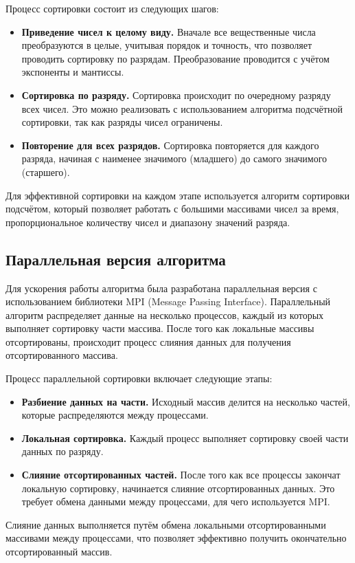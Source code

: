 \documentclass[12pt]{article}
\begin{document}
Процесс сортировки состоит из следующих шагов: \begin{itemize} \item \textbf{Приведение чисел к целому виду.} Вначале все вещественные числа преобразуются в целые, учитывая порядок и точность, что позволяет проводить сортировку по разрядам. Преобразование проводится с учётом экспоненты и мантиссы. \item \textbf{Сортировка по разряду.} Сортировка происходит по очередному разряду всех чисел. Это можно реализовать с использованием алгоритма подсчётной сортировки, так как разряды чисел ограничены. \item \textbf{Повторение для всех разрядов.} Сортировка повторяется для каждого разряда, начиная с наименее значимого (младшего) до самого значимого (старшего). \end{itemize}

Для эффективной сортировки на каждом этапе используется алгоритм сортировки подсчётом, который позволяет работать с большими массивами чисел за время, пропорциональное количеству чисел и диапазону значений разряда.

\subsection*{Параллельная версия алгоритма} Для ускорения работы алгоритма была разработана параллельная версия с использованием библиотеки MPI (Message Passing Interface). Параллельный алгоритм распределяет данные на несколько процессов, каждый из которых выполняет сортировку части массива. После того как локальные массивы отсортированы, происходит процесс слияния данных для получения отсортированного массива.

Процесс параллельной сортировки включает следующие этапы: \begin{itemize} \item \textbf{Разбиение данных на части.} Исходный массив делится на несколько частей, которые распределяются между процессами. \item \textbf{Локальная сортировка.} Каждый процесс выполняет сортировку своей части данных по разряду. \item \textbf{Слияние отсортированных частей.} После того как все процессы закончат локальную сортировку, начинается слияние отсортированных данных. Это требует обмена данными между процессами, для чего используется MPI. \end{itemize}

Слияние данных выполняется путём обмена локальными отсортированными массивами между процессами, что позволяет эффективно получить окончательно отсортированный массив.
\end{document}
